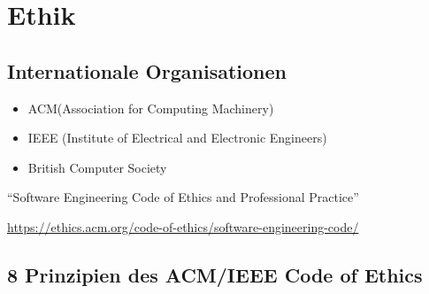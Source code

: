 \documentclass[11pt, a4paper]{article}
\begin{document}
\newpage

\section{Ethik} %

\subsection{Internationale Organisationen}

\begin{itemize}
    \item ACM(Association for Computing Machinery)
    \item IEEE (Institute of Electrical and Electronic Engineers)
    \item British Computer Society
\end{itemize}

“Software Engineering Code of Ethics and Professional Practice”

\footnotesize \url{https://ethics.acm.org/code-of-ethics/software-engineering-code/}

\subsection{8 Prinzipien des ACM/IEEE Code of Ethics}
\end{document}
